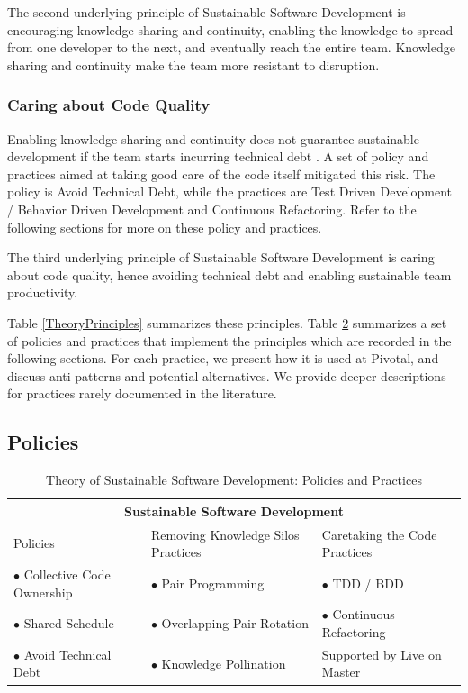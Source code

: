 \begin{table}[]
The second underlying principle of Sustainable Software Development is encouraging knowledge sharing and continuity, enabling the knowledge to spread from one developer to the next, and eventually reach the entire team. Knowledge sharing and continuity make the team more resistant to disruption. 

\subsubsection{Caring about Code Quality}

Enabling knowledge sharing and continuity does not guarantee sustainable development if the team starts incurring technical debt  \cite{McConnellTechnicalDebt}. A set of policy and practices aimed at taking good care of the code itself mitigated this risk. The policy is Avoid Technical Debt, while the practices are Test Driven Development / Behavior Driven Development and Continuous Refactoring. Refer to the following sections for more on these policy and practices.

The third underlying principle of Sustainable Software Development is caring about code quality, hence avoiding technical debt and enabling sustainable team productivity.

Table \ref{TheoryPrinciples} summarizes these principles. Table \ref{TheoryPractices}  summarizes a set of policies and practices that implement the principles which are recorded in the following sections. For each practice, we present how it is used at Pivotal, and discuss anti-patterns and potential alternatives. We provide deeper descriptions for practices rarely documented in the literature.
\subsection{Policies}

\begin{table}[]
\renewcommand{\arraystretch}{1.5}
\centering
\caption{Theory of Sustainable Software Development: Policies and Practices}
\label{TheoryPractices}
\begin{tabular}{l|l|l}
\hline
\multicolumn{3}{c}{Sustainable Software Development}                               \\
\hline
Policies                  & Removing Knowledge Silos Practices & Caretaking the Code Practices         \\
$\bullet$ Collective Code Ownership & $\bullet$ Pair Programming         & $\bullet$  TDD / BDD                   \\
$\bullet$ Shared Schedule           & $\bullet$ Overlapping Pair Rotation & $\bullet$ Continuous Refactoring      \\
$\bullet$ Avoid Technical Debt      & $\bullet$  Knowledge Pollination    & Supported by Live on Master \\ 
\hline
\end{tabular}
\end{table}


\end{table}
